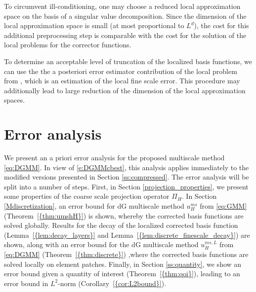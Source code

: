\documentclass[10pt]{article}
\numberwithin{equation}{section}
\theoremstyle{plain}
\theoremstyle{definition}
\theoremstyle{remark}
\begin{document}
To circumvent ill-conditioning, one may choose a reduced local approximation space on the basis of a singular value decomposition. Since the dimension of the local approximation space is small (at most proportional to $L^d$), the cost for this additional preprocessing step is comparable with the cost for the solution of the local problems for the corrector functions.

To determine an acceptable level of truncation of the localized basis functions, we can use the the a posteriori error estimator contribution of the local problem from \cite{EGM12}, which is an estimation of the local fine scale error. This procedure may additionally lead to large reduction of the dimension of the local approximation spaces. 

\section{Error analysis}\label{s:apriori}
We present an a priori error analysis for the proposed multiscale method \eqref{eq:DGMM}. In view of \eqref{e:DGMMcbest}, this analysis applies immediately to the modified versions presented in Section  \ref{ss:compressed}. The error analysis will be split into a number of steps.
First, in Section \ref{projection_properties}, we present some properties of the coarse scale projection operator ${\Pi_H}$.
In Section \ref{Mdiscretization}, an error bound for dG multiscale method ${u^{ms}_{H}}$ from \eqref{eq:GMM} ({Theorem~\ref{{thm:umshH}}}) is shown, whereby the corrected basis functions are solved globally. Results for the decay of the localized corrected basis function ({Lemma~\ref{{lem:decay_layers}}} and {Lemma~\ref{{lem:discrete_finescale_decay}}}) are shown, along with an error bound for the dG multiscale method ${u^{ms,L}_{H}}$ from \eqref{eq:DGMM} ({Theorem~\ref{{thm:discrete}}}) ,where the corrected basis functions are solved locally on element patches. Finally, in Section \ref{ss:quantity}, we show an error bound given a quantity of interest ({Theorem~\ref{{thm:qoi}}}), leading to an error bound in $L^2$-norm ({Corollary~\ref{{cor:L2bound}}}).
\end{document}
